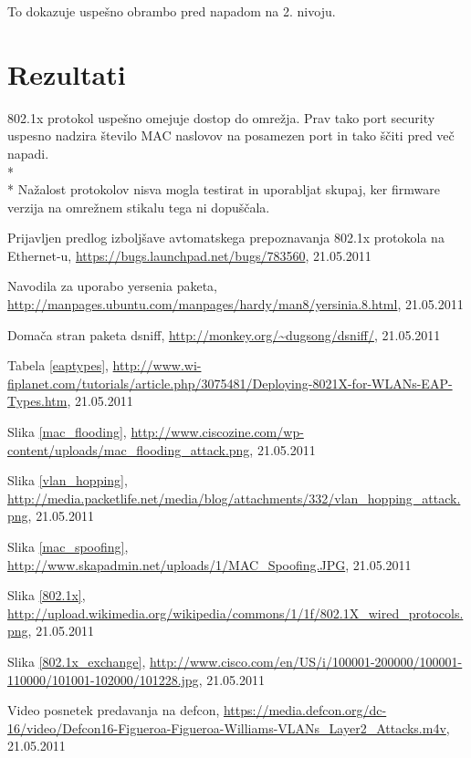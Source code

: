 \documentclass[12pt]{article}
\let\stdsection\section
\renewcommand\section{\newpage\stdsection}
\begin{document}
To dokazuje uspešno obrambo pred napadom na 2. nivoju.

\section{Rezultati}

802.1x protokol uspešno omejuje dostop do omrežja. Prav tako port security uspesno nadzira število MAC naslovov na posamezen port in tako ščiti pred več napadi.
\\*
\\* \indent
Nažalost protokolov nisva mogla testirat in uporabljat skupaj, ker firmware verzija na omrežnem stikalu tega ni dopuščala. 

\clearpage
{}
\begin{thebibliography}{9}

Prijavljen predlog izboljšave avtomatskega prepoznavanja 802.1x protokola na Ethernet-u, \url{https://bugs.launchpad.net/bugs/783560}, 21.05.2011

Navodila za uporabo yersenia paketa, \url{http://manpages.ubuntu.com/manpages/hardy/man8/yersinia.8.html}, 21.05.2011

Domača stran paketa dsniff, \url{http://monkey.org/~dugsong/dsniff/}, 21.05.2011

Tabela \ref{eaptypes}, \url{http://www.wi-fiplanet.com/tutorials/article.php/3075481/Deploying-8021X-for-WLANs-EAP-Types.htm}, 21.05.2011

Slika \ref{mac_flooding}, \url{http://www.ciscozine.com/wp-content/uploads/mac_flooding_attack.png}, 21.05.2011

Slika \ref{vlan_hopping}, \url{http://media.packetlife.net/media/blog/attachments/332/vlan_hopping_attack.png}, 21.05.2011

Slika \ref{mac_spoofing}, \url{http://www.skapadmin.net/uploads/1/MAC_Spoofing.JPG}, 21.05.2011

Slika \ref{802.1x}, \url{http://upload.wikimedia.org/wikipedia/commons/1/1f/802.1X_wired_protocols.png}, 21.05.2011

Slika \ref{802.1x_exchange}, \url{http://www.cisco.com/en/US/i/100001-200000/100001-110000/101001-102000/101228.jpg}, 21.05.2011

\bibitem{}
Video posnetek predavanja na defcon, \url{https://media.defcon.org/dc-16/video/Defcon16-Figueroa-Figueroa-Williams-VLANs_Layer2_Attacks.m4v}, 21.05.2011


\end{thebibliography}
\end{document}
